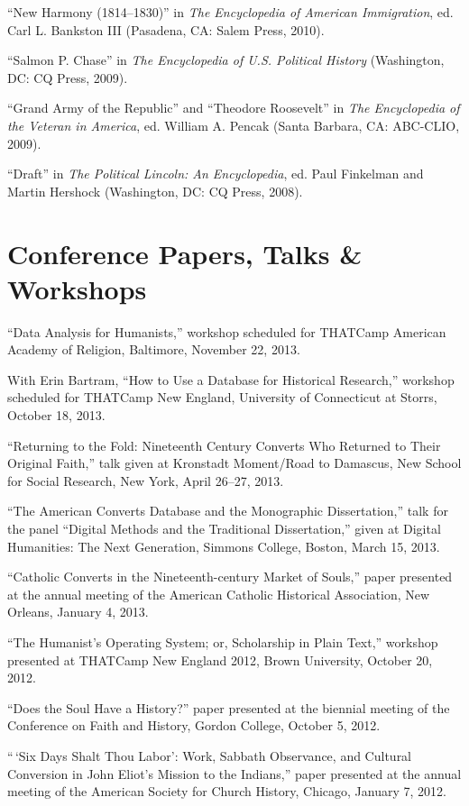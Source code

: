 \documentclass[11pt]{article}
\begin{document}
``New Harmony (1814--1830)'' in \emph{The Encyclopedia of American
Immigration}, ed. Carl L. Bankston III (Pasadena, CA: Salem Press,
2010).

``Salmon P. Chase'' in \emph{The Encyclopedia of U.S. Political History}
(Washington, DC: CQ Press, 2009).

``Grand Army of the Republic'' and ``Theodore Roosevelt'' in \emph{The
Encyclopedia of the Veteran in America}, ed. William A. Pencak (Santa
Barbara, CA: ABC-CLIO, 2009).

``Draft'' in \emph{The Political Lincoln: An Encyclopedia}, ed. Paul
Finkelman and Martin Hershock (Washington, DC: CQ Press, 2008).

\section{Conference Papers, Talks \& Workshops}

``Data Analysis for Humanists,'' workshop scheduled for THATCamp American 
Academy of Religion, Baltimore, November 22, 2013.

With Erin Bartram, ``How to Use a Database for Historical
Research,'' workshop scheduled for THATCamp New England, University of 
Connecticut at Storrs, October 18, 2013.

``Returning to the Fold: Nineteenth Century Converts Who Returned to
Their Original Faith,'' talk given at Kronstadt Moment/Road to
Damascus, New School for Social Research, New York, April 26--27, 2013.

``The American Converts Database and the Monographic Dissertation,''
talk for the panel ``Digital Methods and the Traditional Dissertation,''
given at Digital Humanities: The Next Generation, Simmons College,
Boston, March 15, 2013.

``Catholic Converts in the Nineteenth-century Market of Souls,'' paper
presented at the annual meeting of the American Catholic Historical
Association, New Orleans, January 4, 2013.

``The Humanist's Operating System; or, Scholarship in Plain Text,''
workshop presented at THATCamp New England 2012, Brown University,
October 20, 2012.

``Does the Soul Have a History?'' paper presented at the biennial
meeting of the Conference on Faith and History, Gordon College, October
5, 2012.

``\,`Six Days Shalt Thou Labor': Work, Sabbath Observance, and Cultural
Conversion in John Eliot's Mission to the Indians,'' paper presented at
the annual meeting of the American Society for Church History, Chicago,
January 7, 2012.
\end{document}
